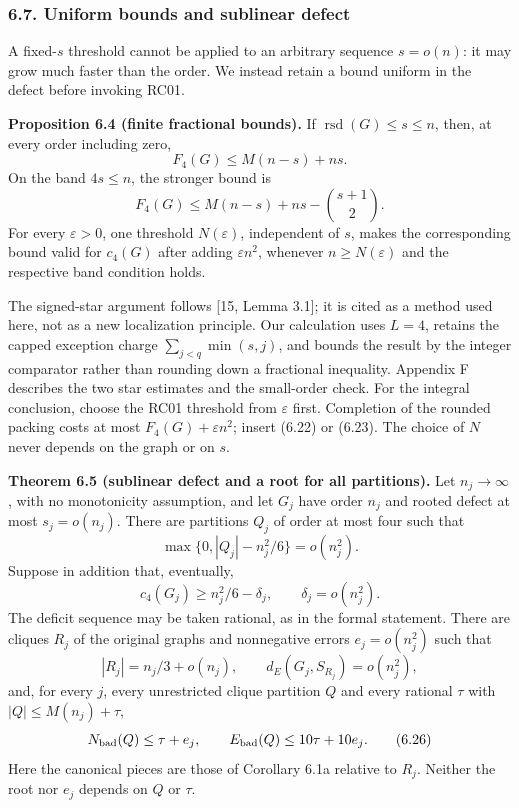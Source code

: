 \documentclass[english,11pt,a4paper]{article}
\begin{document}
\subsubsection{6.7. Uniform bounds and sublinear defect}\label{uniform-bounds-and-sublinear-defect}

A fixed-\(s\) threshold cannot be applied to an arbitrary sequence \(s=o(n)\): it may grow much faster than the order. We instead retain a bound uniform in the defect before invoking RC01.


\textbf{Proposition 6.4 (finite fractional bounds).} If \(\operatorname{rsd}(G)\le s\le n\), then, at every order including zero, \[
F_4(G)\le M(n-s)+ns.
\tag{6.22}
\] On the band \(4s\le n\), the stronger bound is \[
F_4(G)\le M(n-s)+ns-\binom{s+1}{2}.
\tag{6.23}
\] For every \(\varepsilon>0\), one threshold \(N(\varepsilon)\), independent of \(s\), makes the corresponding bound valid for \(c_4(G)\) after adding \(\varepsilon n^2\), whenever \(n\ge N(\varepsilon)\) and the respective band condition holds.

The signed-star argument follows {[}15, Lemma 3.1{]}; it is cited as a method used here, not as a new localization principle. Our calculation uses \(L=4\), retains the capped exception charge \(\sum_{j<q}\min(s,j)\), and bounds the result by the integer comparator rather than rounding down a fractional inequality. Appendix F describes the two star estimates and the small-order check. For the integral conclusion, choose the RC01 threshold from \(\varepsilon\) first. Completion of the rounded packing costs at most \(F_4(G)+\varepsilon n^2\); insert (6.22) or (6.23). The choice of \(N\) never depends on the graph or on \(s\).


\textbf{Theorem 6.5 (sublinear defect and a root for all partitions).} Let \(n_j\to\infty\), with no monotonicity assumption, and let \(G_j\) have order \(n_j\) and rooted defect at most \(s_j=o(n_j)\). There are partitions \(Q_j\) of order at most four such that \[
\max\{0,|Q_j|-n_j^2/6\}=o(n_j^2).
\tag{6.24}
\] Suppose in addition that, eventually, \[
c_4(G_j)\ge n_j^2/6-\delta_j,\qquad \delta_j=o(n_j^2).
\] The deficit sequence may be taken rational, as in the formal statement. There are cliques \(R_j\) of the original graphs and nonnegative errors \(e_j=o(n_j^2)\) such that \[
|R_j|=n_j/3+o(n_j),\qquad
d_E(G_j,S_{R_j})=o(n_j^2),
\tag{6.25}
\] and, for every \(j\), every unrestricted clique partition \(Q\) and every rational \(\tau\) with \(|Q|\le M(n_j)+\tau\), \[
N_{\rm bad}(Q)\le\tau+e_j,\qquad
E_{\rm bad}(Q)\le10\tau+10e_j.
\tag{6.26}
\] Here the canonical pieces are those of Corollary 6.1a relative to \(R_j\). Neither the root nor \(e_j\) depends on \(Q\) or \(\tau\).
\end{document}
